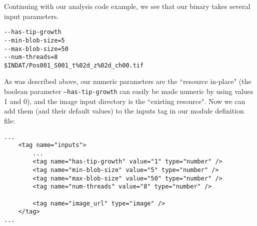 
Continuing with our analysis code example, we see that our binary takes several input parameters.
\begin{verbatim}
--has-tip-growth 
--min-blob-size=5 
--max-blob-size=50 
--num-threads=8 
$INDAT/Pos001_S001_t%02d_z%02d_ch00.tif
\end{verbatim}

As was described above, our numeric parameters are the ``resource in-place" (the boolean parameter \texttt{--has-tip-growth} can easily be made numeric by using values 1 and 0), and the image input directory is the ``existing resource".
Now we can add them (and their default values) to the inputs tag in our module definition file:
\begin{verbatim}
...
    <tag name="inputs">
        ...
        <tag name="has-tip-growth" value="1" type="number" />
        <tag name="min-blob-size" value="5" type="number" />
        <tag name="max-blob-size" value="50" type="number" />
        <tag name="num-threads" value="8" type="number" />
        
        <tag name="image_url" type="image" />
    </tag>
...
\end{verbatim}


%
%
%
%
